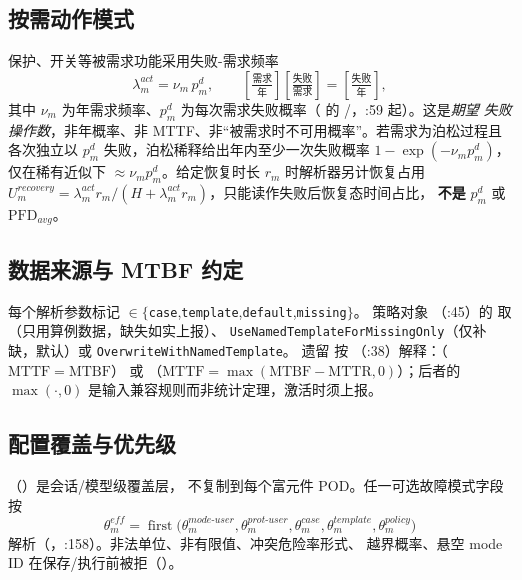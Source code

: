 \subsection{按需动作模式}
保护、开关等被需求功能采用失败-需求频率
\begin{equation}
\lambda_m^{act}=\nu_m\,p_m^d,\qquad
\left[\tfrac{\text{需求}}{\text{年}}\right]\!\left[\tfrac{\text{失败}}{\text{需求}}\right]
=\left[\tfrac{\text{失败}}{\text{年}}\right],
\end{equation}
其中 $\nu_m$ 为年需求频率、$p_m^d$ 为每次需求失败概率（
的 /，:59 起）。这是\emph{期望
失败操作数}，非年概率、非 MTTF、非“被需求时不可用概率”。若需求为泊松过程且各次独立以
$p_m^d$ 失败，泊松稀释给出年内至少一次失败概率 $1-\exp(-\nu_m p_m^d)$，仅在稀有近似下
$\approx\nu_m p_m^d$。给定恢复时长 $r_m$ 时解析器另计恢复占用
$U_m^{recovery}=\lambda_m^{act}r_m/(H+\lambda_m^{act}r_m)$，只能读作失败后恢复态时间占比，
\textbf{不是} $p_m^d$ 或 $\mathrm{PFD}_{avg}$。

\subsection{数据来源与 MTBF 约定}
每个解析参数标记 $\in\{$\texttt{case},\texttt{template},\texttt{default},\texttt{missing}$\}$。
策略对象 （:45）的  取
（只用算例数据，缺失如实上报）、
\texttt{UseNamedTemplateFor\allowbreak MissingOnly}（仅补缺，默认）或
\texttt{OverwriteWithNamed\allowbreak Template}。
遗留  按 （:38）解释：（$\mathrm{MTTF}=\mathrm{MTBF}$）
或 （$\mathrm{MTTF}=\max(\mathrm{MTBF}-\mathrm{MTTR},0)$）；后者的
$\max(\cdot,0)$ 是输入兼容规则而非统计定理，激活时须上报。

\subsection{配置覆盖与优先级}
（）是会话/模型级覆盖层，
不复制到每个富元件 POD。任一可选故障模式字段按
\begin{equation}
\theta_m^{eff}=\operatorname{first}\!\big(
\theta_m^{mode\text{-}user},\theta_m^{prot\text{-}user},\theta_m^{case},
\theta_m^{template},\theta_m^{policy}\big)
\end{equation}
解析（，:158）。非法单位、非有限值、冲突危险率形式、
越界概率、悬空 mode ID 在保存/执行前被拒（）。

